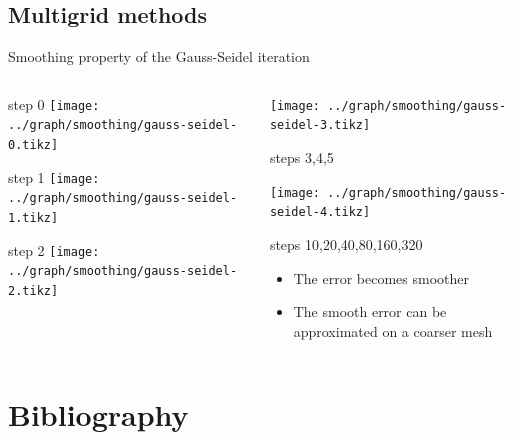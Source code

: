 \documentclass[american,ignorenonframetext,notheorems,aspectratio=1610]{beamer}
\begin{document}
\subsection{Multigrid methods}

\begin{frame}{Smoothing property of the Gauss-Seidel iteration}
    \begin{columns}
    \begin{column}{.45\textwidth}
      \begin{flushright}
        step 0
        \texttt{[image: ../graph/smoothing/gauss-seidel-0.tikz]}

        step 1
        \texttt{[image: ../graph/smoothing/gauss-seidel-1.tikz]}
        
        step 2
        \texttt{[image: ../graph/smoothing/gauss-seidel-2.tikz]}
      \end{flushright}
    \end{column}
    \begin{column}{.45\textwidth}
      \pause
      \begin{center}
        \texttt{[image: ../graph/smoothing/gauss-seidel-3.tikz]}
        
        steps 3,4,5
        
        \pause
        \texttt{[image: ../graph/smoothing/gauss-seidel-4.tikz]}
        
        steps 10,20,40,80,160,320        
      \end{center}
      \pause
      \begin{itemize}
      \item The error becomes smoother
      \item The smooth error can be approximated on a coarser mesh
      \end{itemize}
    \end{column}
  \end{columns}
\end{frame}


\section{Bibliography}
\frame{
}
\end{document}
